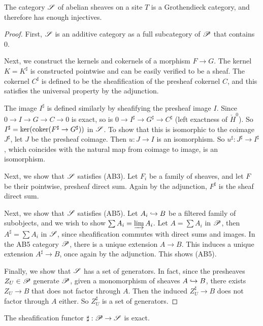\documentclass[11pt]{amsart}
\begin{document}
\begin{thm}
    The category $\mathscr{S}$ of abelian sheaves on a site $T$ is a Grothendieck category, and therefore has enough injectives.
\end{thm}

\begin{proof}
    First, $\mathscr{S}$ is an additive category as a full subcategory of $\mathscr{P}$ that contains 0.

    Next, we construct the kernels and cokernels of a morphism $F\to G$. The kernel $K = K^\sharp$ is constructed pointwise and can be easily verified to be a sheaf. The cokernel $C^\sharp$ is defined to be the sheafification of the presheaf cokernel $C$, and this satisfies the universal property by the adjunction.

    The image $I^\sharp$ is defined similarly by sheafifying the presheaf image $I$. Since $0\to I\to G\to C \to 0$ is exact, so is $0\to I^\sharp \to G^\sharp \to C^\sharp$ (left exactness of $\check{H}^0$). So $I^\sharp = \ker(\operatorname{coker}(F^\sharp \to G^\sharp))$ in $\mathscr{S}$. To show that this is isomorphic to the coimage $J^\sharp$, let $J$ be the presheaf coimage. Then $u:J\to I$ is an isomorphism. So $u^\sharp: J^\sharp \to I^\sharp$, which coincides with the natural map from coimage to image, is an isomorphism.

    Next, we show that $\mathscr{S}$ satisfies (AB3). Let $F_i$ be a family of sheaves, and let $F$ be their pointwise, presheaf direct sum. Again by the adjunction, $F^\sharp$ is the sheaf direct sum.

    Next, we show that $\mathscr{S}$ satisfies (AB5). Let $A_i\hookrightarrow B$ be a filtered family of subobjects, and we wish to show $\sum A_i = \varinjlim A_i$. Let $A = \sum A_i$ in $\mathscr{P}$, then $A^\sharp = \sum A_i$ in $\mathscr{S}$, since sheafification commutes with direct sums and images. In the AB5 category $\mathscr{P}$, there is a unique extension $A\to B$. This induces a unique extension $A^\sharp \to B$, once again by the adjunction. This shows (AB5).

    Finally, we show that $\mathscr{S}$ has a set of generators. In fact, since the presheaves $Z_U \in \mathscr{P}$ generate $\mathscr{P}$, given a monomorphism of sheaves $A\hookrightarrow B$, there exists $Z_U\to B$ that does not factor through $A$. Then the induced $Z_U^\sharp \to B$ does not factor through $A$ either. So $Z_U^\sharp$ is a set of generators.
\end{proof}


\begin{prop}
    The sheafification functor $\sharp: \mathscr{P} \to \mathscr{S}$ is exact.
\end{prop}
\end{document}
